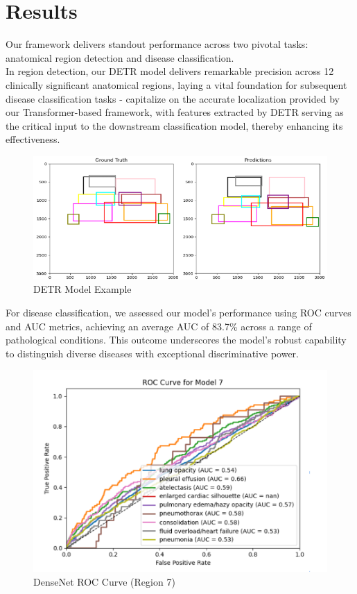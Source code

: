 \documentclass[10pt,twocolumn,letterpaper]{article}
\begin{document}
\section{Results}
Our framework delivers standout performance across two pivotal tasks: anatomical region detection and disease classification. \\

In region detection, our DETR model delivers remarkable precision across 12 clinically significant anatomical regions, laying a vital foundation for subsequent disease classification tasks - capitalize on the accurate localization provided by our Transformer-based framework, with features extracted by DETR serving as the critical input to the downstream classification model, thereby enhancing its effectiveness.

\begin{figure}[H]
    \centering
    \includegraphics[width=1\linewidth]{assets/detr_performance.png}
    \caption{DETR Model Example}
    \label{fig:enter-label}
\end{figure}

For disease classification, we assessed our model’s performance using ROC curves and AUC metrics, achieving an average AUC of 83.7\% across a range of pathological conditions. This outcome underscores the model’s robust capability to distinguish diverse diseases with exceptional discriminative power.

\begin{figure}[H]
    \centering
    \includegraphics[width=1\linewidth]{assets/Region_7.png}
    \caption{DenseNet ROC Curve (Region 7)}
    \label{fig:enter-label}
\end{figure}
\end{document}
